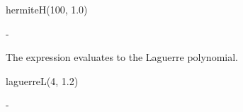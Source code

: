 {{{{{{{{{{{\begin{xtc}
\end{xtc}
\begin{xtc}
\begin{xtccomment}
\end{xtccomment}
\begin{spadsrc}
hermiteH(100, 1.0)
\end{spadsrc}
\begin{TeXOutput}
\begin{fricasmath}{13}
-{}%
\end{fricasmath}
\end{TeXOutput}
\end{xtc}
\begin{xtc}
\begin{xtccomment}
The expression  evaluates to the  Laguerre
polynomial.
\end{xtccomment}
\begin{spadsrc}
\end{spadsrc}
\begin{TeXOutput}
\begin{fricasmath}{14}
%
\end{fricasmath}
\end{TeXOutput}
\end{xtc}
\begin{xtc}
\begin{xtccomment}
\end{xtccomment}
\begin{spadsrc}
laguerreL(4, 1.2)
\end{spadsrc}
\begin{TeXOutput}
\begin{fricasmath}{15}
-{}%
\end{fricasmath}
\end{TeXOutput}
\end{xtc}
\begin{xtc}
\begin{xtccomment}
\end{xtccomment}
\begin{spadsrc}

\end{spadsrc}
\end{xtc}}}}}}}}}}}}
